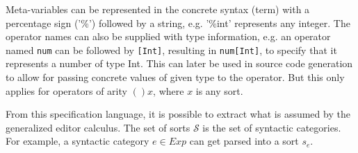 \documentclass[sigplan,review]{acmart}
\begin{document}
Meta-variables can be represented in the concrete syntax (term) with a percentage sign ('\%') followed by a string, e.g. '\%int' represents any integer. The operator
names can also be supplied with type information, e.g. an operator named
\texttt{num} can be followed by \texttt{[Int]}, resulting in \texttt{num[Int]}, to specify that it represents a number of type Int. This can later be used in source code generation to allow for passing concrete values of given type to the operator. But this only applies for operators of arity $()x$, where $x$ is any sort.

From this specification language, it is possible to extract what is assumed by the generalized editor calculus. The set of sorts $\mathcal{S}$ is the set of syntactic categories. For example, a syntactic category $e \in Exp$ can get parsed into a sort $s_{e}$.
\end{document}
